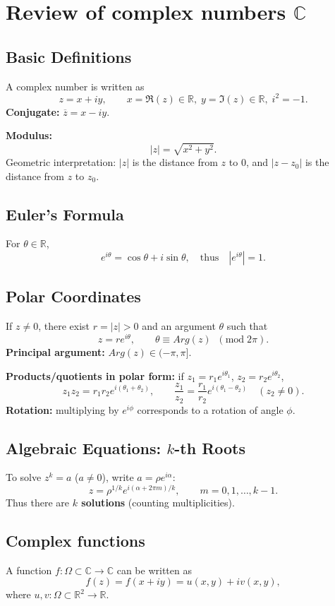 
\chapter{Review of complex numbers $\mathbb{C}$}\label{chap:}

\section{Basic Definitions}
A complex number is written as
\[
z = x + iy, \qquad x=\Re(z)\in\mathbb{R},\; y=\Im(z)\in\mathbb{R},\; i^2=-1.
\]
\textbf{Conjugate:} $\overline{z}=x-iy$.

\textbf{Modulus:}
\[
|z| = \sqrt{x^2+y^2}.
\]
Geometric interpretation: $|z|$ is the distance from $z$ to $0$, and $|z-z_0|$ is the distance from $z$ to $z_0$.

\section{Euler's Formula}
For $\theta\in\mathbb{R}$,
\[
e^{i\theta}=\cos\theta+i\sin\theta,
\quad\text{thus}\quad |e^{i\theta}|=1.
\]

\section{Polar Coordinates}
If $z\neq 0$, there exist $r=|z|>0$ and an argument $\theta$ such that
\[
z = r e^{i\theta}, \qquad \theta \equiv Arg(z)\;\;(\mathrm{mod}\;2\pi).
\]
\textbf{Principal argument:} $Arg(z)\in(-\pi,\pi]$.

\textbf{Products/quotients in polar form:} if $z_1=r_1e^{i\theta_1}$, $z_2=r_2e^{i\theta_2}$,
\[
z_1z_2 = r_1r_2 e^{i(\theta_1+\theta_2)}, \qquad
\frac{z_1}{z_2} = \frac{r_1}{r_2} e^{i(\theta_1-\theta_2)} \quad (z_2\neq 0).
\]
\textbf{Rotation:} multiplying by $e^{i\phi}$ corresponds to a rotation of angle $\phi$.

\section{Algebraic Equations: $k$-th Roots}
To solve $z^k = a$ ($a\neq 0$), write $a=\rho e^{i\alpha}$:
\[
z = \rho^{1/k} e^{i(\alpha+2\pi m)/k}, \qquad m=0,1,\dots,k-1.
\]
Thus there are \textbf{$k$ solutions} (counting multiplicities).
\section{Complex functions}
A function $f:\Omega\subset\mathbb{C}\to\mathbb{C}$ can be written as
\[
f(z)=f(x+iy)=u(x,y)+iv(x,y),
\]
where $u,v:\Omega\subset\mathbb{R}^2\to\mathbb{R}$.


